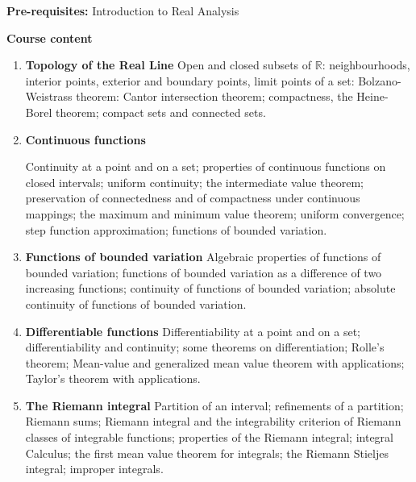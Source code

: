 \documentclass[11pt,a4paper]{article}
\numberwithin{equation}{section}
\theoremstyle{definition}
\begin{document}
\pagebreak

\textbf{Pre-requisites:} Introduction to Real Analysis


\textbf{Course content}
\begin{enumerate}
\item \textbf{Topology of the Real Line}
Open and closed subsets of $\mathbb{R}$: neighbourhoods, interior points, exterior and boundary points, limit points of a set: Bolzano-Weistrass theorem: Cantor intersection theorem; compactness, the Heine-Borel theorem; compact sets and connected sets.


\item \textbf{Continuous functions}

Continuity at a point and on a set; properties of continuous functions on closed intervals; uniform continuity; the intermediate value theorem; preservation of connectedness and of compactness under continuous mappings; the maximum and minimum value theorem; uniform convergence; step function approximation; functions of bounded variation.

\item \textbf{Functions of bounded variation}
Algebraic properties of functions of bounded variation; functions of bounded variation as a difference of two increasing functions; continuity of functions of bounded variation; absolute continuity of functions of bounded variation.


\item \textbf{Differentiable functions}
Differentiability at a point and on a set; differentiability and continuity; some theorems on differentiation; Rolle's theorem; Mean-value and generalized mean value theorem with applications; Taylor's theorem with applications.


\item \textbf{The Riemann integral}
Partition of an interval; refinements of a partition; Riemann sums; Riemann integral and the integrability criterion of Riemann classes of integrable functions; properties of the Riemann integral; integral Calculus; the first mean value theorem for integrals; the Riemann Stieljes integral; improper integrals.
\end{enumerate}
\end{document}
